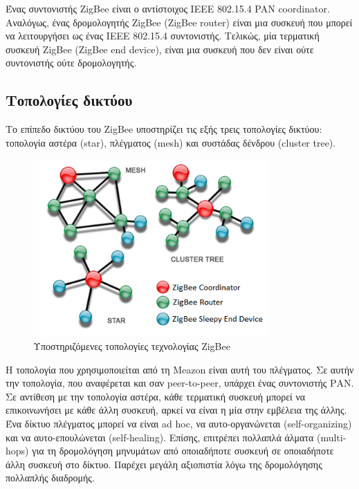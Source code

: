 \documentclass[12pt, a4paper, oneside]{report}
\begin{document}
Ένας συντονιστής ZigBee είναι ο αντίστοιχος IEEE 802.15.4 PAN coordinator. Αναλόγως, ένας δρομολογητής ZigBee (ZigBee router) είναι μια συσκευή που μπορεί να λειτουργήσει ως ένας IEEE 802.15.4 συντονιστής. Τελικώς, μία τερματική συσκευή ZigBee (ZigBee end device), είναι μια συσκευή που δεν είναι ούτε συντονιστής ούτε δρομολογητής.

\subsection{Τοπολογίες δικτύου}

Το επίπεδο δικτύου του ZigBee υποστηρίζει τις εξής τρεις τοπολογίες δικτύου: τοπολογία αστέρα (star), πλέγματος (mesh) και συστάδας δένδρου (cluster tree).
\begin{figure}[hb]
\centering
\includegraphics[width=0.8\textwidth]{eikona_16}
\caption[Υποστηριζόμενες τοπολογίες τεχνολογίας ZigBee]{Υποστηριζόμενες τοπολογίες τεχνολογίας ZigBee\cite{zig2}}\label{eik16}
\end{figure}

Η τοπολογία που χρησιμοποιείται από τη Meazon είναι αυτή του πλέγματος. Σε αυτήν την τοπολογία, που αναφέρεται και σαν peer-to-peer, υπάρχει ένας συντονιστής ΡΑΝ. Σε αντίθεση με την τοπολογία αστέρα, κάθε τερματική συσκευή μπορεί να επικοινωνήσει με κάθε άλλη συσκευή, αρκεί να είναι η μία στην εμβέλεια της άλλης. Ένα δίκτυο πλέγματος μπορεί να είναι ad hoc, να αυτο-οργανώνεται (self-organizing) και να αυτο-επουλώνεται
(self-healing). Επίσης, επιτρέπει πολλαπλά άλματα (multi-hops) για τη
δρομολόγηση μηνυμάτων από οποιαδήποτε συσκευή σε οποιαδήποτε άλλη
συσκευή στο δίκτυο. Παρέχει μεγάλη αξιοπιστία λόγω της δρομολόγησης πολλαπλής διαδρομής.\clearpage
\end{document}
